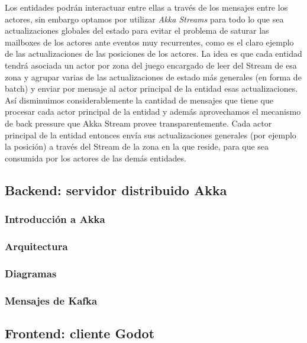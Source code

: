 Los entidades podrán interactuar entre ellas a través de los mensajes entre los actores, 
sin embargo optamos por utilizar \textit{Akka Streams} para todo lo que sea actualizaciones globales 
del estado para evitar el problema de saturar las mailboxes de los actores ante eventos muy 
recurrentes, como es el claro ejemplo de las actualizaciones de las posiciones de los actores. 
La idea es que cada entidad tendrá asociada un actor por zona del juego encargado de leer del 
Stream de esa zona y agrupar varias de las actualizaciones de estado más generales (en forma de batch) 
y enviar por mensaje al actor principal de la entidad esas actualizaciones. 
Así disminuimos considerablemente la cantidad de mensajes que tiene que procesar cada actor 
principal de la entidad y además aprovechamos el mecanismo de back pressure que Akka Stream 
provee transparentemente. Cada actor principal de la entidad entonces envía sus actualizaciones 
generales (por ejemplo la posición) a través del Stream de la zona en la que reside, para que 
sea consumida por los actores de las demás entidades.



\subsection{Backend: servidor distribuido Akka}

\subsubsection{Introducción a Akka}

\subsubsection{Arquitectura}

\subsubsection{Diagramas}

\subsubsection{Mensajes de Kafka}


\subsection{Frontend: cliente Godot}

